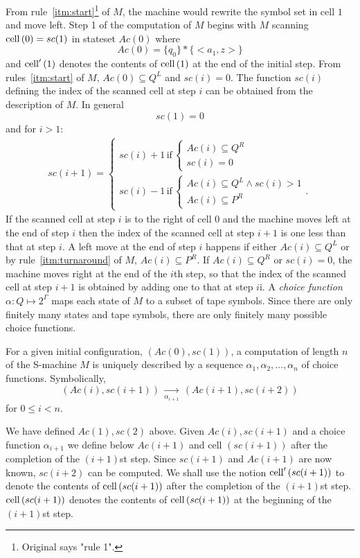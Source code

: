 From rule~\ref{itm:start}\footnote{Original says "rule 1".}
of $M$, the machine would rewrite the symbol set in cell $1$ and move left.
Step 1 of the computation of $M$ begins with $M$ scanning $\mathrm{cell}\left(0\right) = sc(1)$ in
stateset $Ac(0)$ where
\[
    Ac(0) = \{q_0\} * \{<a_1, z>\}
\]
and $\mathrm{cell}'\left(1\right)$ denotes the contents of $\mathrm{cell}\left(1\right)$ at the end of the initial step.
From rules~\ref{itm:start} of $M$, $Ac(0) \subseteq Q^L$ and $sc(i) = 0$.
The function $sc(i)$ defining the index of the scanned cell at step $i$ can
be obtained from the description of $M$.
In general
\[
    sc(1) = 0
\]
and for $i > 1$:
\begin{align*}
    sc(i+1) =
    \begin{cases}
        sc(i)+1 \,\mathrm{if}\, \begin{cases} Ac(i) \subseteq Q^R \\ sc(i) = 0 \end{cases} \\
        sc(i)-1 \,\mathrm{if}\, \begin{cases} Ac(i) \subseteq Q^L \land sc(i) > 1 \\ Ac(i) \subseteq P^R \end{cases}.
    \end{cases}
\end{align*}
If the scanned cell at step $i$ is to the right of cell $0$ and the machine moves
left at the end of step $i$ then the index of the scanned cell at step $i+1$
is one less than that at step $i$.
A left move at the end of step $i$ happens
if either $Ac(i) \subseteq Q^L$ or by rule~\ref{itm:turnaround} of $M$,
$Ac(i) \subseteq P^R$.
If $Ac(i) \subseteq Q^R$ or $sc(i) = 0$, the machine moves right at the end of the
$i$th step, so that the index of the scanned cell at step $i+1$ is obtained by
adding one to that at step $i$i.
A \emph{choice function} $\alpha : Q \mapsto 2^\Gamma$ maps each state of $M$ to
a subset of tape symbols.
Since there are only finitely many states and tape symbols, there are only
finitely many possible choice functions.

For a given initial configuration, $(Ac(0), sc(1))$, a computation of length $n$
of the S-machine $M$ is uniquely described by a sequence $\alpha_1,\alpha_2,\ldots,
\alpha_n$ of choice functions.
Symbolically,
\[
    (Ac(i), sc(i+1)) \, \xrightarrow[\alpha_{i+1}]{} \, (Ac(i+1), sc(i+2))
\]
for $0 \leq i < n$.

We have defined $Ac(1), sc(2)$ above.
Given $Ac(i), sc(i+1)$ and a choice function $\alpha_{i+1}$ we define
below $Ac(i+1)$ and cell $(sc(i+1))$ after the completion of the $(i+1)$st step.
Since $sc(i+1)$ and $Ac(i+1)$ are now known, $sc(i+2)$ can be computed.
We shall use the notion $\mathrm{cell}'\left(sc(i+1)\right)$ to denote the contents of $\mathrm{cell}\left(sc(i+1)\right)$
after the completion of the $(i+1)$st step.
$\mathrm{cell}\left(sc(i+1)\right)$ denotes the contents of $\mathrm{cell}\left(sc(i+1)\right)$ at the
beginning of the $(i+1)$st step.

